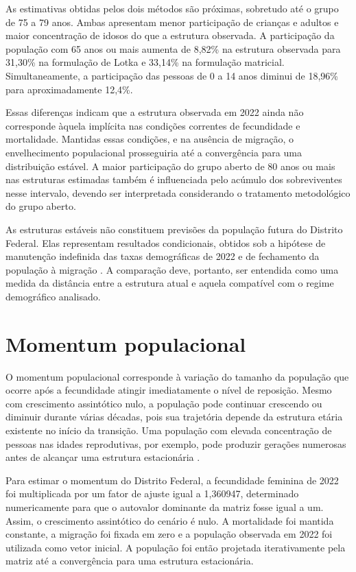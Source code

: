 \documentclass[a4paper,12pt]{article}
\begin{document}
As estimativas obtidas pelos dois métodos são próximas, sobretudo até o grupo de 75 a 79 anos. Ambas apresentam menor participação de crianças e adultos e maior concentração de idosos do que a estrutura observada. A participação da população com 65 anos ou mais aumenta de 8,82\% na estrutura observada para 31,30\% na formulação de Lotka e 33,14\% na formulação matricial. Simultaneamente, a participação das pessoas de 0 a 14 anos diminui de 18,96\% para aproximadamente 12,4\%.

Essas diferenças indicam que a estrutura observada em 2022 ainda não corresponde àquela implícita nas condições correntes de fecundidade e mortalidade. Mantidas essas condições, e na ausência de migração, o envelhecimento populacional prosseguiria até a convergência para uma distribuição estável. A maior participação do grupo aberto de 80 anos ou mais nas estruturas estimadas também é influenciada pelo acúmulo dos sobreviventes nesse intervalo, devendo ser interpretada considerando o tratamento metodológico do grupo aberto.

As estruturas estáveis não constituem previsões da população futura do Distrito Federal. Elas representam resultados condicionais, obtidos sob a hipótese de manutenção indefinida das taxas demográficas de 2022 e de fechamento da população à migração \cite{grupofoz2021,preston2001}. A comparação deve, portanto, ser entendida como uma medida da distância entre a estrutura atual e aquela compatível com o regime demográfico analisado.


\section{Momentum populacional}

O momentum populacional corresponde à variação do tamanho da população que ocorre após a fecundidade atingir imediatamente o nível de reposição. Mesmo com crescimento assintótico nulo, a população pode continuar crescendo ou diminuir durante várias décadas, pois sua trajetória depende da estrutura etária existente no início da transição. Uma população com elevada concentração de pessoas nas idades reprodutivas, por exemplo, pode produzir gerações numerosas antes de alcançar uma estrutura estacionária \cite{grupofoz2021,preston2001}.

Para estimar o momentum do Distrito Federal, a fecundidade feminina de 2022 foi multiplicada por um fator de ajuste igual a 1,360947, determinado numericamente para que o autovalor dominante da matriz fosse igual a um. Assim, o crescimento assintótico do cenário é nulo. A mortalidade foi mantida constante, a migração foi fixada em zero e a população observada em 2022 foi utilizada como vetor inicial. A população foi então projetada iterativamente pela matriz até a convergência para uma estrutura estacionária.
\end{document}
